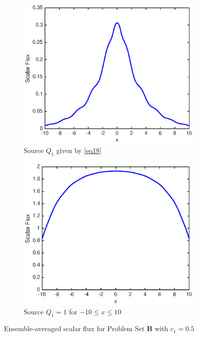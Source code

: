 \documentclass[12pt]{article}
\begin{document}
\begin{figure}[hbt]
    \centering
    \begin{subfigure}{0.495\textwidth}
        \centering
        \includegraphics[width=\textwidth]{fig3a.eps}
        \caption{Source $Q_1$ given by \cref{eq18}}
        \label{fig3a}
    \end{subfigure}
    \hfill
    \begin{subfigure}{0.495\textwidth}
        \centering
        \includegraphics[width=\textwidth]{fig3b.eps}
        \caption{Source $Q_1=1$ for $-10\leq x\leq 10$}
        \label{fig3b}
    \end{subfigure}
    \caption{Ensemble-averaged scalar flux for Problem Set {\bf B} with $c_1=0.5$}
    \label{fig3}
\end{figure}
\end{document}
